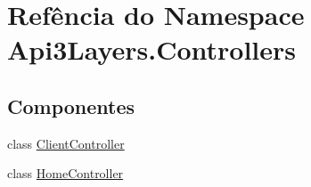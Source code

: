\hypertarget{namespaceApi3Layers_1_1Controllers}{}\section{Refência do Namespace Api3\+Layers.\+Controllers}
\label{namespaceApi3Layers_1_1Controllers}
\subsection*{Componentes}
\begin{DoxyCompactItemize}
\item 
class \hyperlink{classApi3Layers_1_1Controllers_1_1ClientController}{Client\+Controller}
\item 
class \hyperlink{classApi3Layers_1_1Controllers_1_1HomeController}{Home\+Controller}
\end{DoxyCompactItemize}
